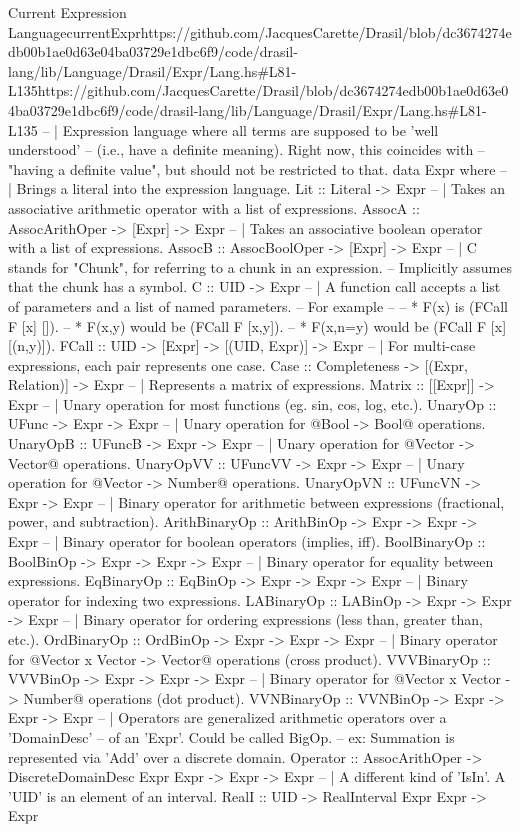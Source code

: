 \begin{haskell}{Current Expression Language}{currentExpr}{https://github.com/JacquesCarette/Drasil/blob/dc3674274edb00b1ae0d63e04ba03729e1dbc\linebreak{}6f9/code/drasil-lang/lib/Language/Drasil/Expr/Lang.hs\#L81-L135}{https://github.com/JacquesCarette/Drasil/blob/dc3674274edb00b1ae0d63e04ba03729e1dbc6f9/code/drasil-lang/lib/Language/Drasil/Expr/Lang.hs\#L81-L135}
-- | Expression language where all terms are supposed to be 'well understood'
--   (i.e., have a definite meaning). Right now, this coincides with
--   "having a definite value", but should not be restricted to that.
data Expr where
  -- | Brings a literal into the expression language.
  Lit :: Literal -> Expr
  -- | Takes an associative arithmetic operator with a list of expressions.
  AssocA   :: AssocArithOper -> [Expr] -> Expr
  -- | Takes an associative boolean operator with a list of expressions.
  AssocB   :: AssocBoolOper  -> [Expr] -> Expr
  -- | C stands for "Chunk", for referring to a chunk in an expression.
  --   Implicitly assumes that the chunk has a symbol.
  C        :: UID -> Expr
  -- | A function call accepts a list of parameters and a list of named parameters.
  --   For example
  --
  --   * F(x) is (FCall F [x] []).
  --   * F(x,y) would be (FCall F [x,y]).
  --   * F(x,n=y) would be (FCall F [x] [(n,y)]).
  FCall    :: UID -> [Expr] -> [(UID, Expr)] -> Expr
  -- | For multi-case expressions, each pair represents one case.
  Case     :: Completeness -> [(Expr, Relation)] -> Expr
  -- | Represents a matrix of expressions.
  Matrix   :: [[Expr]] -> Expr
  -- | Unary operation for most functions (eg. sin, cos, log, etc.).
  UnaryOp       :: UFunc -> Expr -> Expr
  -- | Unary operation for @Bool -> Bool@ operations.
  UnaryOpB      :: UFuncB -> Expr -> Expr
  -- | Unary operation for @Vector -> Vector@ operations.
  UnaryOpVV     :: UFuncVV -> Expr -> Expr
  -- | Unary operation for @Vector -> Number@ operations.
  UnaryOpVN     :: UFuncVN -> Expr -> Expr
  -- | Binary operator for arithmetic between expressions (fractional, power, and subtraction).
  ArithBinaryOp :: ArithBinOp -> Expr -> Expr -> Expr
  -- | Binary operator for boolean operators (implies, iff).
  BoolBinaryOp  :: BoolBinOp -> Expr -> Expr -> Expr
  -- | Binary operator for equality between expressions.
  EqBinaryOp    :: EqBinOp -> Expr -> Expr -> Expr
  -- | Binary operator for indexing two expressions.
  LABinaryOp    :: LABinOp -> Expr -> Expr -> Expr
  -- | Binary operator for ordering expressions (less than, greater than, etc.).
  OrdBinaryOp   :: OrdBinOp -> Expr -> Expr -> Expr
  -- | Binary operator for @Vector x Vector -> Vector@ operations (cross product).
  VVVBinaryOp   :: VVVBinOp -> Expr -> Expr -> Expr
  -- | Binary operator for @Vector x Vector -> Number@ operations (dot product).
  VVNBinaryOp   :: VVNBinOp -> Expr -> Expr -> Expr
  -- | Operators are generalized arithmetic operators over a 'DomainDesc'
  --   of an 'Expr'.  Could be called BigOp.
  --   ex: Summation is represented via 'Add' over a discrete domain.
  Operator :: AssocArithOper -> DiscreteDomainDesc Expr Expr -> Expr -> Expr
  -- | A different kind of 'IsIn'. A 'UID' is an element of an interval.
  RealI    :: UID -> RealInterval Expr Expr -> Expr
\end{haskell}

